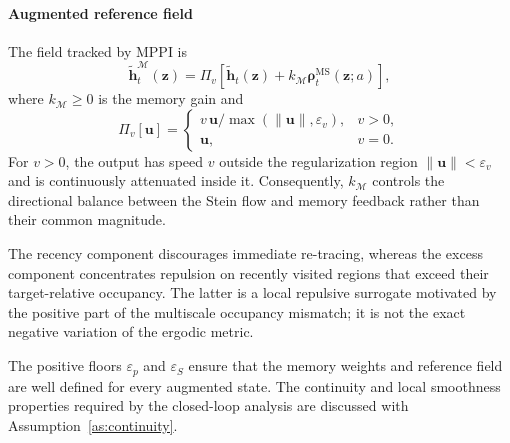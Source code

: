 \documentclass[conference]{IEEEtran}
\begin{document}
{\paragraph{Augmented reference field}
The field tracked by MPPI is
\begin{equation}\label{eq:augmented_reference_flow}
\widetilde{\mathbf h}_t^{\mathcal M}(\mathbf z)
=
\Pi_v\!\left[
\widetilde{\mathbf h}_t(\mathbf z)
+
k_{\mathcal M}
\boldsymbol\rho_t^{\mathrm{MS}}(\mathbf z;a)
\right],
\end{equation}
where $k_{\mathcal M}\ge0$ is the memory gain and
\begin{equation}\label{eq:speed_gauge}
\Pi_v[\mathbf u]
=
\begin{cases}
v\,\mathbf u/
\max(\|\mathbf u\|,\varepsilon_v),
& v>0,\\[2pt]
\mathbf u,
& v=0.
\end{cases}
\end{equation}
For $v>0$, the output has speed $v$ outside the regularization region
$\|\mathbf u\|<\varepsilon_v$ and is continuously attenuated inside it.
Consequently, $k_{\mathcal M}$ controls the directional balance between the
Stein flow and memory feedback rather than their common magnitude.

The recency component discourages immediate re-tracing, whereas the excess
component concentrates repulsion on recently visited regions that exceed their
target-relative occupancy. The latter is a local repulsive surrogate motivated
by the positive part of the multiscale occupancy mismatch; it is not the exact
negative variation of the ergodic metric.

The positive floors $\varepsilon_p$ and $\varepsilon_S$ ensure that the
memory weights and reference field are well defined for every augmented state.
The continuity and local smoothness properties required by the closed-loop
analysis are discussed with Assumption~\ref{as:continuity}.

}
\end{document}
